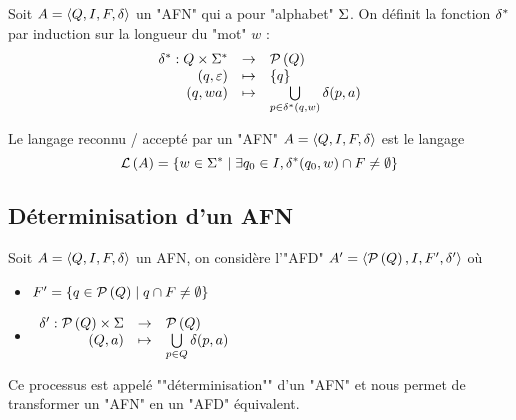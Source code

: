\begin{definition}
	Soit $A = \langle Q, I, F, \delta \rangle$ un "AFN" qui a pour "alphabet" $\Sigma$. On définit la fonction $\delta^{*}$ par induction sur la longueur du "mot" $w$ :
	$$ \begin{array}{rcl}
			\delta^{*} : Q \times \Sigma^{*} & \to     & \mathcal{P}\left(Q\right)                                                  \\
			(q, \varepsilon)                   & \mapsto & \left\{q\right\}                                                    \\
			(q, wa)                         & \mapsto & \bigcup\limits_{p \in \delta^{*} (q, w)} \delta(p, a)
		\end{array} $$
\end{definition}


\begin{definition}
	Le langage reconnu / accepté par un "AFN" $A = \langle Q, I, F, \delta \rangle$ est le langage
	$$ \mathcal{L}\left(A\right) = \left\{w \in \Sigma^{*} \mid \exists q_0 \in I, \delta^{*}(q_0, w) \cap F \neq \emptyset\right\} $$

\end{definition}

\subsection{Déterminisation d'un AFN}

Soit $A = \langle Q, I, F, \delta \rangle$ un AFN, on considère l'"AFD" $A' = \langle \mathcal{P}\left(Q\right), I, F', \delta' \rangle$ où
\begin{itemize}
	\item $F' = \left\{q \in \mathcal{P}\left(Q\right) \mid q \cap F \neq \emptyset\right\}$
	      \vspace{0.25cm}
	\item $ \begin{array}{rcl}
			      \delta' : \mathcal{P}\left(Q\right) \times \Sigma & \to     & \mathcal{P}\left(Q\right)                              \\
			      (Q, a)                              & \mapsto & \bigcup\limits_{p \in Q} \delta(p, a)
		      \end{array} $
\end{itemize}

\vspace{0.25cm}

Ce processus est appelé ""déterminisation"" d'un "AFN" et nous permet de transformer un "AFN" en un "AFD" équivalent.

